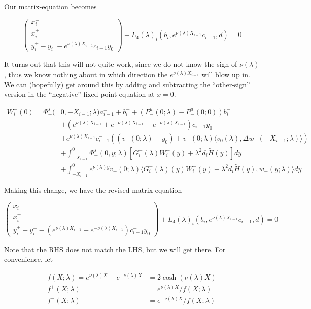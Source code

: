 \documentclass[12pt]{article}
\begin{document}
\begin{enumerate}
Our matrix-equation becomes

\[
\begin{pmatrix}x_i^- \\ x_i^+ \\ y_i^+ - y_i^- - e^{\nu(\lambda)X_{i-1}} c_{i-1}^- y_0 \end{pmatrix} + L_4(\lambda)_i(b_i, e^{\nu(\lambda)X_{i-1}} c_{i-1}^-, d) = 0
\]

It turns out that this will not quite work, since we do not know the sign of $\nu(\lambda)$, thus we know nothing about in which direction the $e^{\nu(\lambda)X_{i-1}}$ will blow up in. We can (hopefully) get around this by adding and subtracting the ``other-sign'' version in the ``negative'' fixed point equation at $x = 0$.

\begin{align*}
W_i^-(0) = \Phi^s_-(&0, -X_{i-1}; \lambda)a_{i-1}^- + b_i^- + (P^u_-(0; \lambda) - P^u_-(0; 0))b_i^- \\
&+ (e^{\nu(\lambda)X_{i-1}} + e^{-\nu(\lambda)X_{i-1}} - e^{-\nu(\lambda)X_{i-1}}) c_{i-1}^- y_0 \\
&+ e^{\nu(\lambda)X_{i-1}} c_{i-1}^- ( (v_-(0; \lambda) - y_0) + v_-(0; \lambda) \langle  v_0(\lambda), \Delta w_-(-X_{i-1}; \lambda) \rangle) \\
&+ \int_{-X_{i-1}}^0 \Phi^s_-(0, y; \lambda) [ G_i^-(\lambda)W_i^-(y) + \lambda^2 d_i \tilde{H}(y) ] dy \\
&+ \int_{-X_{i-1}}^0
e^{\nu(\lambda)y} v_-(0; \lambda) \langle G_i^-(\lambda)(y)W_i^-(y) + \lambda^2 d_i \tilde{H}(y), w_-(y; \lambda) \rangle dy
\end{align*}

Making this change, we have the revised matrix equation

\[
\begin{pmatrix}x_i^- \\ x_i^+ \\ y_i^+ - y_i^- - (e^{\nu(\lambda)X_{i-1}} + e^{-\nu(\lambda)X_{i-1}})c_{i-1}^- y_0 \end{pmatrix} + L_4(\lambda)_i(b_i, e^{\nu(\lambda)X_{i-1}} c_{i-1}^-, d) = 0
\]

Note that the RHS does not match the LHS, but we will get there. For convenience, let

\begin{align*}
f(X; \lambda) = e^{\nu(\lambda)X} + e^{-\nu(\lambda)X} &= 2 \cosh (\nu(\lambda) X) \\
f^+(X; \lambda) &= e^{\nu(\lambda)X} / f(X; \lambda) \\
f^-(X; \lambda) &= e^{-\nu(\lambda)X} / f(X; \lambda)
\end{align*}


\end{enumerate}
\end{document}
